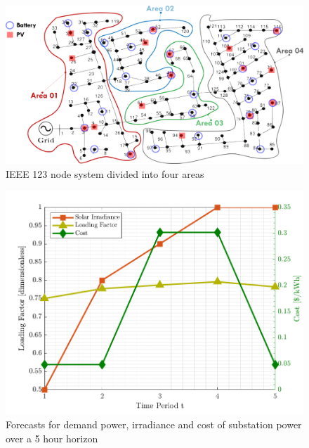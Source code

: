 \documentclass[../../outputs/main.tex]{subfiles}
\begin{document}
\begin{figure}[t]
    \centering
    \includegraphics[width=\linewidth]{../figures/ieee123-FourAreas-pv20-batt30.png}
    \caption{IEEE 123 node system divided into four areas}
    \label{fig:ieee123-four-area-figure}
    \vspace{-4mm}
\end{figure}


\begin{figure}[t]
    \centering
    \includegraphics[height=0.25\textheight]{../figures/T5-inputCurves/InputCurves_Horizon_5.png}
    \caption{Forecasts for demand power, irradiance and cost of substation power over a 5 hour horizon}
    \label{fig:inputCurve-5}
    \vspace{-4mm}
\end{figure}
\end{document}
